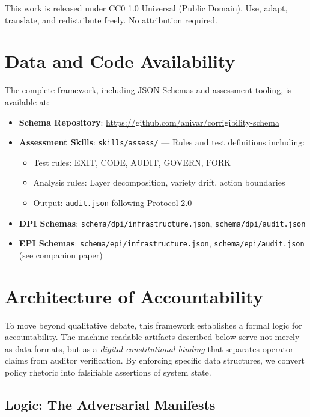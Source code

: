 \documentclass{article}
\begin{document}
This work is released under CC0 1.0 Universal (Public Domain). Use, adapt, translate, and redistribute freely. No attribution required.

\section*{Data and Code Availability}

The complete framework, including JSON Schemas and assessment tooling, is available at:

\begin{itemize}
    \item \textbf{Schema Repository}: \url{https://github.com/anivar/corrigibility-schema}
    \item \textbf{Assessment Skills}: \texttt{skills/assess/} --- Rules and test definitions including:
    \begin{itemize}
        \item Test rules: EXIT, CODE, AUDIT, GOVERN, FORK
        \item Analysis rules: Layer decomposition, variety drift, action boundaries
        \item Output: \texttt{audit.json} following Protocol 2.0
    \end{itemize}
    \item \textbf{DPI Schemas}: \texttt{schema/dpi/infrastructure.json}, \texttt{schema/dpi/audit.json}
    \item \textbf{EPI Schemas}: \texttt{schema/epi/infrastructure.json}, \texttt{schema/epi/audit.json} (see companion paper)
\end{itemize}

\appendix

\section{Architecture of Accountability}
\label{appendix:architecture}

To move beyond qualitative debate, this framework establishes a formal logic for accountability. The machine-readable artifacts described below serve not merely as data formats, but as a \textit{digital constitutional binding} that separates operator claims from auditor verification. By enforcing specific data structures, we convert policy rhetoric into falsifiable assertions of system state.

\subsection{Logic: The Adversarial Manifests}
\end{document}
